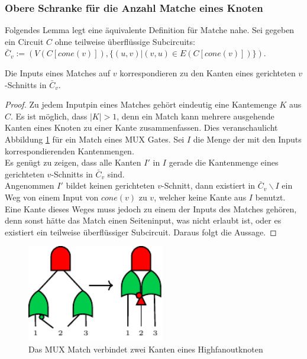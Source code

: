 \documentclass[11pt, a4paper, german]{article}
\begin{document}
\subsubsection{Obere Schranke für die Anzahl Matche eines Knoten}
\label{subsubsec:anzahl_matchings}
Folgendes Lemma legt eine äquivalente Definition für Matche nahe.
Sei gegeben ein Circuit $C$ ohne teilweise überflüssige Subcircuits: \\$\bar{C}_v := (V(C[cone(v)]), \{ (u,v) | (v,u) \in E(C[cone(v)])\})$.
\begin{lemma}{Die Inputs eines Matches auf $v$ korrespondieren zu den Kanten eines gerichteten $v$-Schnitts in $\bar{C}_v $}.
\end{lemma}
\begin{proof}
Zu jedem Inputpin eines Matches gehört eindeutig eine Kantemenge $K$ aus $C$. Es ist möglich, dass $|K| > 1$, denn ein Match kann mehrere ausgehende Kanten eines Knoten zu einer Kante zusammenfassen. Dies veranschaulicht Abbildung \ref{bild:mux_match} für ein Match eines MUX Gates.  Sei $I$ die Menge der mit den Inputs korrespondierenden Kantenmengen.\\
Es genügt zu zeigen, dass alle Kanten $I'$ in $I$ gerade die Kantenmenge eines gerichteten $v$-Schnitts in $\bar{C}_v$ sind. \\
Angenommen $I'$ bildet keinen gerichteten $v$-Schnitt, dann existiert in $\bar{C}_v\backslash I$ ein Weg von einem Input von $cone(v)$ zu $v$, welcher keine Kante aus $I$ benutzt. \\
Eine Kante dieses Weges muss jedoch zu einem der Inputs des Matches gehören, denn sonst hätte das Match einen Seiteninput, was nicht erlaubt ist, oder es existiert ein teilweise überflüssiger Subcircuit. Daraus folgt die Aussage. 
\end{proof}
\begin{figure}
		\includegraphics[width = 6cm]{pictures/compiled/mux_match}
		\caption{Das MUX Match verbindet zwei Kanten eines Highfanoutknoten}
		\label{bild:mux_match}
\end{figure}
\end{document}
